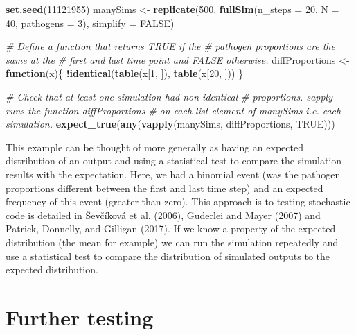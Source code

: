 \documentclass[
]{article}
\newenvironment{Shaded}{\begin{snugshade}}{\end{snugshade}}
\newcommand{\CommentTok}[1]{\textcolor[rgb]{0.56,0.35,0.01}{\textit{#1}}}
\newcommand{\ControlFlowTok}[1]{\textcolor[rgb]{0.13,0.29,0.53}{\textbf{#1}}}
\newcommand{\DataTypeTok}[1]{\textcolor[rgb]{0.13,0.29,0.53}{#1}}
\newcommand{\DecValTok}[1]{\textcolor[rgb]{0.00,0.00,0.81}{#1}}
\newcommand{\KeywordTok}[1]{\textcolor[rgb]{0.13,0.29,0.53}{\textbf{#1}}}
\newcommand{\NormalTok}[1]{#1}
\newcommand{\OperatorTok}[1]{\textcolor[rgb]{0.81,0.36,0.00}{\textbf{#1}}}
\newcommand{\OtherTok}[1]{\textcolor[rgb]{0.56,0.35,0.01}{#1}}
\newcommand{\StringTok}[1]{\textcolor[rgb]{0.31,0.60,0.02}{#1}}
\begin{document}
\begin{Shaded}
\begin{Highlighting}[]
\KeywordTok{set.seed}\NormalTok{(}\DecValTok{11121955}\NormalTok{)}
\NormalTok{manySims <-}\StringTok{ }\KeywordTok{replicate}\NormalTok{(}\DecValTok{500}\NormalTok{, }
                      \KeywordTok{fullSim}\NormalTok{(}\DataTypeTok{n_steps =} \DecValTok{20}\NormalTok{, }\DataTypeTok{N =} \DecValTok{40}\NormalTok{, }
                              \DataTypeTok{pathogens =} \DecValTok{3}\NormalTok{), }
                      \DataTypeTok{simplify =} \OtherTok{FALSE}\NormalTok{)}

\CommentTok{# Define a function that returns TRUE if the}
\CommentTok{#   pathogen proportions are the same at the }
\CommentTok{#   first and last time point and FALSE otherwise.}
\NormalTok{diffProportions <-}\StringTok{ }\ControlFlowTok{function}\NormalTok{(x)\{}
  \OperatorTok{!}\KeywordTok{identical}\NormalTok{(}\KeywordTok{table}\NormalTok{(x[}\DecValTok{1}\NormalTok{, ]), }\KeywordTok{table}\NormalTok{(x[}\DecValTok{20}\NormalTok{, ]))}
\NormalTok{\}}

\CommentTok{# Check that at least one simulation had non-identical}
\CommentTok{#   proportions. sapply runs the function diffProportions }
\CommentTok{#   on each list element of manySims i.e. each simulation.}
\KeywordTok{expect_true}\NormalTok{(}\KeywordTok{any}\NormalTok{(}\KeywordTok{vapply}\NormalTok{(manySims, diffProportions, }\OtherTok{TRUE}\NormalTok{)))}
\end{Highlighting}
\end{Shaded}

This example can be thought of more generally as having an expected distribution of an output and using a statistical test to compare the simulation results with the expectation.
Here, we had a binomial event (was the pathogen proportions different between the first and last time step) and an expected frequency of this event (greater than zero).
This approach is to testing stochastic code is detailed in Ševčíková et al. (2006), Guderlei and Mayer (2007) and Patrick, Donnelly, and Gilligan (2017).
If we know a property of the expected distribution (the mean for example) we can run the simulation repeatedly and use a statistical test to compare the distribution of simulated outputs to the expected distribution.

\hypertarget{further-testing}{%
\section{Further testing}\label{further-testing}}
\end{document}
